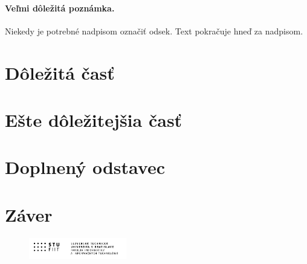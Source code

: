 \documentclass[10pt,twoside,slovak,a4paper]{article}
\begin{document}
\paragraph{Veľmi dôležitá poznámka.}
Niekedy je potrebné nadpisom označiť odsek. Text pokračuje hneď za nadpisom.



\section{Dôležitá časť} \label{dolezita}




\section{Ešte dôležitejšia časť} \label{dolezitejsia}


\section{Doplnený odstavec}

\section{Záver} \label{zaver} %
\begin{figure}
  \centering
  \includegraphics[width=0.38\textwidth]{STU-FIIT-ncb.png}
\end{figure}





\end{document}

